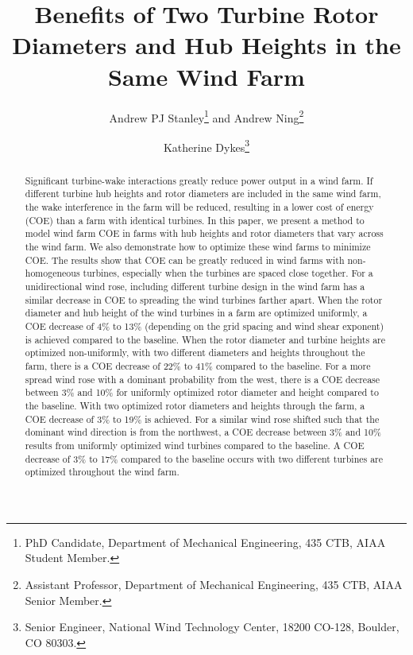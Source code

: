 \documentclass[conf]{new-aiaa}
\title{Benefits of Two Turbine Rotor Diameters and Hub Heights in the Same Wind Farm}
\author{Andrew PJ Stanley\footnote{PhD Candidate, Department of Mechanical Engineering, 435 CTB, AIAA Student Member.} and Andrew Ning\footnote{Assistant Professor, Department of Mechanical Engineering, 435 CTB, AIAA Senior Member.}}
\affil{Brigham Young University, Provo, Utah, 84602}
\author{Katherine Dykes\footnote{Senior Engineer, National Wind Technology Center, 18200 CO-128, Boulder, CO 80303.}}
\affil{National Renewable Energy Laboratory, Golden, Colorado, 80401}
\begin{document}
\maketitle

\begin{abstract}
Significant turbine-wake interactions greatly reduce power output in a wind farm. If different turbine hub heights and rotor diameters are included in the same wind farm, the wake interference in the farm will be reduced, resulting in a lower cost of energy (COE) than a farm with identical turbines. In this paper, we present a method to model wind farm COE in farms with hub heights and rotor diameters that vary across the wind farm. We also demonstrate how to optimize these wind farms to minimize COE. The results show that COE can be greatly reduced in wind farms with non-homogeneous turbines, especially when the turbines are spaced close together.
For a unidirectional wind rose, including different turbine design in the wind farm has a similar decrease in COE to spreading the wind turbines farther apart.
When the rotor diameter and hub height of the wind turbines in a farm are optimized uniformly, a COE decrease of 4\% to 13\% (depending on the grid spacing and wind shear exponent) is achieved compared to the baseline. When the rotor diameter and turbine heights are optimized non-uniformly, with two different diameters and heights throughout the farm, there is a COE decrease of 22\% to 41\% compared to the baseline. For a more spread wind rose with a dominant probability from the west, there is a COE decrease between 3\% and 10\% for uniformly optimized rotor diameter and height compared to the baseline. With two optimized rotor diameters and heights through the farm, a COE decrease of 3\% to 19\% is achieved. For a similar wind rose shifted such that the dominant wind direction is from the northwest, a COE decrease between 3\% and 10\% results from uniformly optimized wind turbines compared to the baseline. A COE decrease of 3\% to 17\% compared to the baseline occurs with two different turbines are optimized throughout the wind farm.
\end{abstract}
\end{document}
